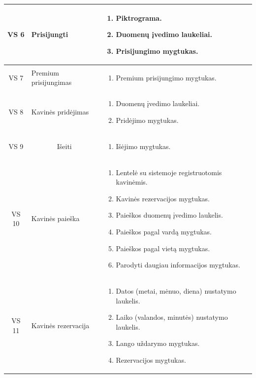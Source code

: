 \documentclass{VUMIFPSkursinis}
\begin{document}
{{{{{\begin{center}
\begin{longtable}{|p{2cm}|p{}|p{}|}
	\hline
		\multicolumn{1}{|c|}{VS 6}& 	
		{Prisijungti}&
		\multicolumn{1}{|p{8,6cm}|}{
			\begin{enumerate}
				\item Piktrograma. 
				\item Duomenų įvedimo laukeliai.
				\item Prisijungimo  mygtukas.
			\end{enumerate}}\\
	
	\hline
		\multicolumn{1}{|c|}{VS 7}& 	
		{Premium prisijungimas}&
		\multicolumn{1}{|p{8,6cm}|}{
			\begin{enumerate}
				\item Premium prisijungimo mygtukas.
			\end{enumerate}}\\
	
	\hline
		\multicolumn{1}{|c|}{VS 8}& 	
		{Kavinės pridėjimas}&
		\multicolumn{1}{|p{8,6cm}|}{
			\begin{enumerate}
				\item Duomenų įvedimo laukeliai.
				\item Pridėjimo mygtukas.
			\end{enumerate}}\\
	
	\hline 	
		\multicolumn{1}{|c|}{VS 9}&
		\multicolumn{1}{|c|}{Išeiti}&
		\multicolumn{1}{|p{8,6cm}|}{
			\begin{enumerate}
				\item Išėjimo mygtukas.
			\end{enumerate}}\\
	
	\hline	
		\multicolumn{1}{|c|}{VS 10}&
		{Kavinės paieška}&
		\multicolumn{1}{|p{9,2cm}|}{
			\begin{enumerate}
				\item Lentelė su sistemoje registruotomis kavinėmis.
				\item Kavinės rezervacijos mygtukas.
				\item Paieškos duomenų įvedimo laukelis.
				\item Paieškos pagal vardą mygtukas.
				\item Paieškos pagal vietą mygtukas.
				\item Parodyti daugiau informacijos mygtukas.
			\end{enumerate}}\\
	
	\hline 	
		\multicolumn{1}{|c|}{VS 11}&
		{Kavinės rezervacija}&
		\multicolumn{1}{|p{9,2cm}|}{
			\begin{enumerate}
				\item Datos (metai, mėnuo, diena) nustatymo laukelis.
				\item Laiko (valandos, minutės) nustatymo laukelis.
				\item Lango uždarymo mygtukas.
				\item Rezervacijos mygtukas.
			\end{enumerate}}\\
	

\end{longtable}
\end{center}}}}}}
\end{document}
